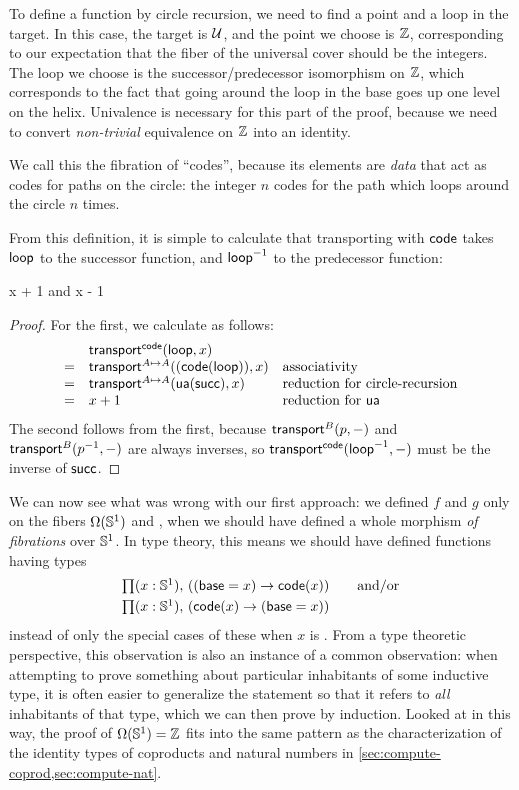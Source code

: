 To define a function by circle recursion, we need to find a point and a
loop in the target.  In this case, the target is $\mathcal{U}$, and the point
we choose is $\mathbb{Z}$, corresponding to our expectation that the
fiber of the universal cover should be the integers.  The loop we choose
is the successor/predecessor isomorphism on $\mathbb{Z}$, which
corresponds to the fact that going around the loop in the base goes up
one level on the helix.  Univalence is necessary for this part of the
proof, because we need to convert \emph{non-trivial} equivalence on $\mathbb{Z}$ into an identity.  

We call this the fibration of ``codes'', because its elements are \emph{data} that act as codes for paths on the circle: the integer $n$ codes for the path which loops around the circle $n$ times.

From this definition, it is simple to calculate that transporting with
$\mathsf{code}$ takes $\mathsf{loop}$ to the successor function, and 
$\mathord{{\mathsf{loop}}^{-1}}$ to the predecessor function:
\begin{lem} \label{lem:transport-s1-code}
 {x + 1} and 
 {x - 1}
\end{lem}
\begin{proof}
For the first, we calculate as follows:
\[
\begin{array}{lll}
 & {\mathsf{transport}^{\mathsf{code}}(\mathsf{loop},x)} &\\
= & \mathsf{transport}^{A \mapsto A}(({\mathsf{code}}({\mathsf{loop}})),x) & \text{associativity}\\
= & \mathsf{transport}^{A \mapsto A}(\mathsf{ua} (\mathsf{succ}),x) & \text{reduction for circle-recursion}\\
= & x + 1 & \text{reduction for \ensuremath{\mathsf{ua}}}
\end{array}
\]
The second follows from the first, because $\mathsf{transport}^{B}(p,-)$  and ${\mathsf{transport}^{B}(\mathord{{p}^{-1}},-)}$ are always inverses, so ${\mathsf{transport}^{\mathsf{code}}(\mathord{{\mathsf{loop}}^{-1}},-)}$ must be the inverse of $\mathsf{succ}$.
\end{proof}

We can now see what was wrong with our first approach: we defined $f$ and $g$ only on the fibers $\Omega(\mathbb{S}^1)$ and \Z, when we should have defined a whole morphism \emph{of fibrations} over $\mathbb{S}^1$.
In type theory, this means we should have defined functions having types
\begin{align}
  \prd{x:\Sn^1} &((\base=x) \to \code(x)) \qquad\text{and/or} \label{eq:pi1s1-encode}\\
  \prd{x:\Sn^1} &(\code(x) \to (\base=x))\label{eq:pi1s1-decode}
\end{align}
instead of only the special cases of these when $x$ is \base.
From a type theoretic perspective, this observation is also an instance of a common observation: when attempting to prove something about particular inhabitants of some inductive type, it is often easier to generalize the statement so that it refers to \emph{all} inhabitants of that type, which we can then prove by induction.
Looked at in this way, the proof of $\Omega(\mathbb{S}^1)=\mathbb{Z}$ fits into the same pattern as the characterization of the identity types of coproducts and natural numbers in \autoref{sec:compute-coprod,sec:compute-nat}.

